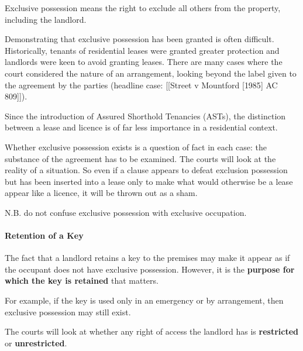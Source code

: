 \documentclass[
]{article}
\newenvironment{Shaded}{}{}
\newcommand{\NormalTok}[1]{#1}
\begin{document}
\begin{Shaded}
\begin{Highlighting}[]
\NormalTok{Exclusive possession means the right to exclude all others from the property, including the landlord.}
\end{Highlighting}
\end{Shaded}

Demonstrating that exclusive possession has been granted is often
difficult. Historically, tenants of residential leases were granted
greater protection and landlords were keen to avoid granting leases.
There are many cases where the court considered the nature of an
arrangement, looking beyond the label given to the agreement by the
parties (headline case: {[}{[}Street v Mountford {[}1985{]} AC
809{]}{]}).

\begin{Shaded}
\begin{Highlighting}[]
\NormalTok{Since the introduction of Assured Shorthold Tenancies (ASTs), the distinction between  a lease and licence is of far less importance in a residential context.}
\end{Highlighting}
\end{Shaded}

Whether exclusive possession exists is a question of fact in each case:
the substance of the agreement has to be examined. The courts will look
at the reality of a situation. So even if a clause appears to defeat
exclusion possession but has been inserted into a lease only to make
what would otherwise be a lease appear like a licence, it will be thrown
out as a sham.

N.B. do not confuse exclusive possession with exclusive occupation.

\hypertarget{retention-of-a-key}{%
\paragraph{Retention of a Key}\label{retention-of-a-key}}

The fact that a landlord retains a key to the premises may make it
appear as if the occupant does not have exclusive possession. However,
it is the \textbf{purpose for which the key is retained} that matters.

For example, if the key is used only in an emergency or by arrangement,
then exclusive possession may still exist.

The courts will look at whether any right of access the landlord has is
\textbf{restricted} or \textbf{unrestricted}.
\end{document}
